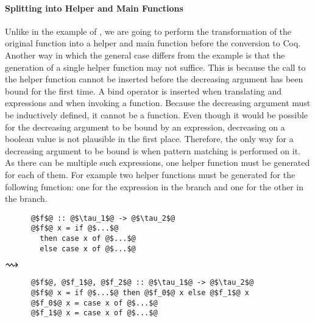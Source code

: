 \paragraph{Splitting into Helper and Main Functions}
Unlike in the example of , we are going to perform the transformation of the original function into a helper and main function before the conversion to Coq.
Another way in which the general case differs from the example is that the generation of a single helper function may not suffice.
This is because the call to the helper function cannot be inserted before the decreasing argument has been bound for the first time.
A bind operator is inserted when translating  and  expressions and when invoking a function.
Because the decreasing argument must be inductively defined, it cannot be a function.
Even though it would be possible for the decreasing argument to be bound by an  expression, decreasing on a boolean value is not plausible in the first place.
Therefore, the only way for a decreasing argument to be bound is when pattern matching is performed on it.
As there can be multiple such  expressions, one helper function must be generated for each of them.
For example two helper functions must be generated for the following function: one for the  expression in the  branch and one for the other in the  branch.

\begin{center}
  \begin{minipage}[t]{0.3\textwidth}
    \begin{verbatim}
      @$f$@ :: @$\tau_1$@ -> @$\tau_2$@
      @$f$@ x = if @$...$@
        then case x of @$...$@
        else case x of @$...$@
    \end{verbatim}
  \end{minipage}
  \begin{minipage}[c]{0.1\textwidth}
    $\mathlarger{\mathlarger{\mathlarger{\rightsquigarrow}}}$
  \end{minipage}
  \begin{minipage}[t]{0.35\textwidth}
    \begin{verbatim}
      @$f$@, @$f_1$@, @$f_2$@ :: @$\tau_1$@ -> @$\tau_2$@
      @$f$@ x = if @$...$@ then @$f_0$@ x else @$f_1$@ x
      @$f_0$@ x = case x of @$...$@
      @$f_1$@ x = case x of @$...$@
    \end{verbatim}
  \end{minipage}
\end{center}

